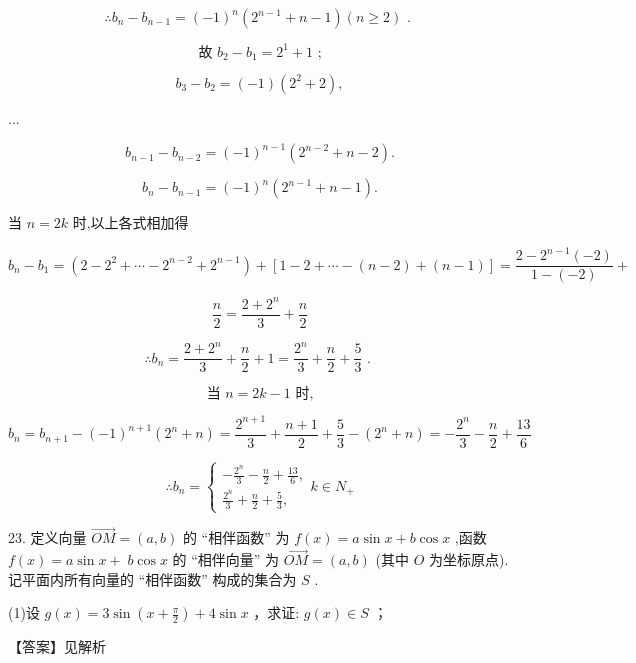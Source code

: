 \documentclass[10pt]{article}
\begin{document}
\[
\therefore {b}_{n} - {b}_{n - 1} = {\left( -1\right) }^{n}\left( {{2}^{n - 1} + n - 1}\right) \left( {n \geq  2}\right) \text{ . }
\]

\[
\text{ 故 }{b}_{2} - {b}_{1} = {2}^{1} + 1\text{ ; }
\]

\[
{b}_{3} - {b}_{2} = \left( {-1}\right) \left( {{2}^{2} + 2}\right) ,
\]

...

\[
{b}_{n - 1} - {b}_{n - 2} = {\left( -1\right) }^{n - 1}\left( {{2}^{n - 2} + n - 2}\right) .
\]

\[
{b}_{n} - {b}_{n - 1} = {\left( -1\right) }^{n}\left( {{2}^{n - 1} + n - 1}\right) .
\]

当 \(n = {2k}\) 时,以上各式相加得

\[
{b}_{n} - {b}_{1} = \left( {2 - {2}^{2} + \cdots  - {2}^{n - 2} + {2}^{n - 1}}\right)  + \left\lbrack  {1 - 2 + \cdots  - \left( {n - 2}\right)  + \left( {n - 1}\right) }\right\rbrack   = \frac{2 - {2}^{n - 1}\left( {-2}\right) }{1 - \left( {-2}\right) } +
\]

\[
\frac{n}{2} = \frac{2 + {2}^{n}}{3} + \frac{n}{2}
\]

\[
\therefore {b}_{n} = \frac{2 + {2}^{n}}{3} + \frac{n}{2} + 1 = \frac{{2}^{n}}{3} + \frac{n}{2} + \frac{5}{3}\text{ . }
\]

\[
\text{ 当 }n = {2k} - 1\text{ 时, }
\]

\[
{b}_{n} = {b}_{n + 1} - {\left( -1\right) }^{n + 1}\left( {{2}^{n} + n}\right)  = \frac{{2}^{n + 1}}{3} + \frac{n + 1}{2} + \frac{5}{3} - \left( {{2}^{n} + n}\right)  =  - \frac{{2}^{n}}{3} - \frac{n}{2} + \frac{13}{6}
\]

\[
\therefore {b}_{n} = \left\{  {\begin{array}{l}  - \frac{{2}^{n}}{3} - \frac{n}{2} + \frac{13}{6}, \\  \frac{{2}^{n}}{3} + \frac{n}{2} + \frac{5}{3}, \end{array}k \in  {N}_{ + }}\right.
\]

23. 定义向量 \(\overrightarrow{OM} = \left( {a,b}\right)\) 的 “相伴函数” 为 \(f\left( x\right)  = a\sin x + b\cos x\) ,函数 \(f\left( x\right)  = a\sin x + \; b\cos x\) 的 “相伴向量” 为 \(\overrightarrow{OM} = \left( {a,b}\right)\) (其中 \(O\) 为坐标原点). 记平面内所有向量的 “相伴函数” 构成的集合为 \(S\) .

(1)设 \(g\left( x\right)  = 3\sin \left( {x + \frac{\pi }{2}}\right)  + 4\sin x\) ，求证: \(g\left( x\right)  \in  S\) ；

【答案】见解析
\end{document}

